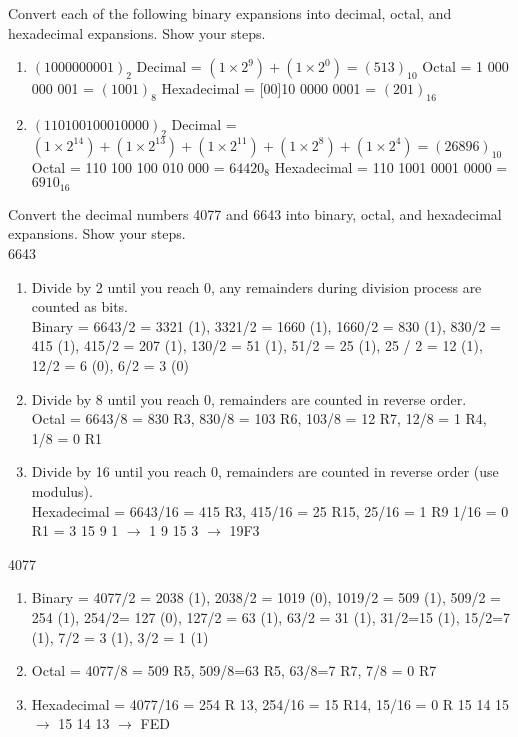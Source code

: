 \documentclass{article}
\begin{document}
	Convert each of the following binary expansions into decimal, octal, and hexadecimal expansions. Show your steps.
	\begin{enumerate}
		\item $(10 0000 0001)_2$
		\subitem Decimal = $(1\times2^9) + (1\times2^0) = (513)_{10} $
		 \subitem Octal = 1 000 000 001 = $(1001)_8$
		 \subitem Hexadecimal =  [00]10 0000 0001 = $(201)_{16}$
		
		\item $(110 1001 0001 0000)_2$
		\subitem Decimal = $(1\times2^{14}) + (1\times2^{13}) + (1\times2^{11}) +(1\times2^{8}) + (1\times2^{4}) = (26896)_{10} $
		\subitem Octal = 110 100 100 010 000 = $64420_{8}$
		\subitem Hexadecimal = 110 1001 0001 0000 = $6910_{16}$
	\end{enumerate}
	

	Convert the decimal numbers 4077 and 6643 into binary, octal, and hexadecimal expansions. Show your steps.\\
	6643
	\begin{enumerate}
		\item Divide by 2 until you reach 0, any remainders during division process are counted as bits.
		\\ Binary =  6643/2 = 3321 (1), 3321/2 = 1660 (1), 1660/2 = 830 (1), 830/2 = 415 (1), 415/2 = 207 (1), 130/2 = 51 (1), 51/2 = 25 (1), 25 / 2 = 12 (1), 12/2 = 6 (0), 6/2 = 3 (0) 
		\item Divide by 8 until you reach 0, remainders are counted in reverse order.
		\\ Octal = 6643/8 = 830 R3, 830/8 = 103 R6, 103/8 = 12 R7, 12/8 = 1 R4, 1/8 = 0 R1
		\item Divide by 16 until you reach 0, remainders are counted in reverse order (use modulus). 
		\\ Hexadecimal = 6643/16 = 415 R3, 415/16 = 25 R15, 25/16 = 1 R9 1/16 = 0 R1
		\subitem  = 3 15 9 1 $\rightarrow$ 1 9 15 3 $\rightarrow$ 19F3
	\end{enumerate}
	4077
	\begin{enumerate}
		
		\item Binary = 4077/2 = 2038 (1), 2038/2 = 1019 (0), 1019/2 = 509 (1), 509/2 = 254 (1), 254/2= 127 (0), 127/2 = 63 (1), 63/2 = 31 (1), 31/2=15 (1), 15/2=7 (1), 7/2 = 3 (1), 3/2 = 1 (1)
		\item Octal = 4077/8 = 509 R5, 509/8=63 R5, 63/8=7 R7, 7/8 = 0 R7
		\item Hexadecimal = 4077/16 = 254 R 13, 254/16 = 15 R14,  15/16 = 0 R 15
		 14 15 $\rightarrow$ 15 14 13 $\rightarrow$ FED
	\end{enumerate}
		
\end{document}
